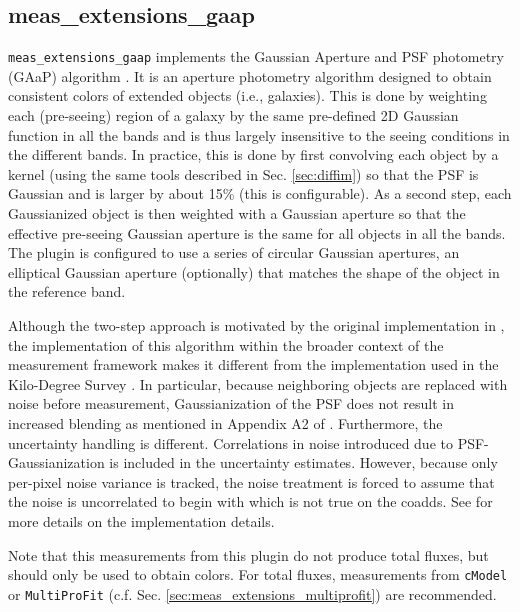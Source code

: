 \subsection{meas\_extensions\_gaap}
\label{sec:meas_extensions_gaap}

\texttt{meas\_extensions\_gaap} implements the Gaussian Aperture and PSF photometry (GAaP) algorithm \citep{2008A&A...482.1053K}.
It is an aperture photometry algorithm designed to obtain consistent colors of extended objects (i.e., galaxies).
This is done by weighting each (pre-seeing) region of a galaxy by the same pre-defined 2D Gaussian function in all the bands and is thus largely insensitive to the seeing conditions in the different bands.
In practice, this is done by first convolving each object by a kernel (using the same tools described in Sec. \ref{sec:diffim}) so that the PSF is Gaussian and is larger by about 15\% (this is configurable).
As a second step, each Gaussianized object is then weighted with a Gaussian aperture so that the effective pre-seeing Gaussian aperture is the same for all objects in all the bands.
The plugin is configured to use a series of circular Gaussian apertures, an elliptical Gaussian aperture (optionally) that matches the shape of the object in the reference band.

Although the two-step approach is motivated by the original implementation in \cite{2008A&A...482.1053K}, the implementation of this algorithm within the broader context of the measurement framework makes it different from the implementation used in the Kilo-Degree Survey \citep[KiDS;][]{2025arXiv250319439W}.
In particular, because neighboring objects are replaced with noise before measurement, Gaussianization of the PSF does not result in increased blending as mentioned in Appendix A2 of \cite{2015MNRAS.454.3500K}.
Furthermore, the uncertainty handling is different.
Correlations in noise introduced due to PSF-Gaussianization is included in the uncertainty estimates.
However, because only per-pixel noise variance is tracked, the noise treatment is forced to assume that the noise is uncorrelated to begin with which is not true on the coadds.
See \cite{DMTN-190} for more details on the implementation details.

Note that this measurements from this plugin do not produce total fluxes, but should only be used to obtain colors.
For total fluxes, measurements from \texttt{cModel} or \texttt{MultiProFit} (c.f. Sec. \ref{sec:meas_extensions_multiprofit}) are recommended.
